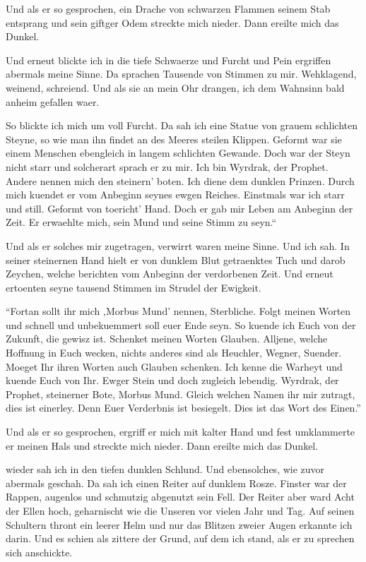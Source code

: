\documentclass[a5paper,8pt]{book}
\begin{document}
Und als er so gesprochen, ein Drache von schwarzen Flammen seinem Stab entsprang und sein giftger Odem streckte mich nieder. Dann ereilte mich das Dunkel.


Und erneut blickte ich in die tiefe Schwaerze und Furcht und Pein ergriffen abermals meine Sinne.
Da sprachen Tausende von Stimmen zu mir. Wehklagend, weinend, schreiend.
Und als sie an mein Ohr drangen, ich dem Wahnsinn bald anheim gefallen waer.

So blickte ich mich um voll Furcht. Da sah ich eine Statue von grauem schlichten Steyne, so wie man ihn findet an des Meeres steilen Klippen. Geformt war sie einem Menschen ebengleich in langem schlichten Gewande. Doch war der Steyn nicht starr und solcherart sprach er zu mir.
Ich bin Wyrdrak, der Prophet. Andere nennen mich den steinern’ boten. Ich diene dem dunklen Prinzen. Durch mich kuendet er vom Anbeginn seynes ewgen Reiches. Einstmals war ich starr und still. Geformt von toericht’ Hand. Doch er gab mir Leben am Anbeginn der Zeit. Er erwaehlte mich, sein Mund und seine Stimm zu seyn.“

Und als er solches mir zugetragen, verwirrt waren meine Sinne. Und ich sah. In seiner steinernen Hand hielt er von dunklem Blut getraenktes Tuch und darob Zeychen, welche berichten vom Anbeginn der verdorbenen Zeit. Und erneut ertoenten seyne tausend Stimmen im Strudel der Ewigkeit.

``Fortan sollt ihr mich ‚Morbus Mund’ nennen, Sterbliche. Folgt meinen Worten und schnell und unbekuemmert soll euer Ende seyn. So kuende ich Euch von der Zukunft, die gewisz ist. Schenket meinen Worten  Glauben. Alljene, welche Hoffnung in Euch wecken, nichts anderes sind als Heuchler, Wegner, Suender. Moeget Ihr ihren Worten auch Glauben schenken. Ich kenne die Warheyt und kuende Euch von Ihr. Ewger Stein und doch zugleich lebendig. Wyrdrak, der Prophet, steinerner Bote, Morbus Mund.
Gleich welchen Namen ihr mir zutragt, dies ist einerley. Denn Euer Verderbnis ist besiegelt. Dies ist das Wort des Einen.''

Und als er so gesprochen, ergriff er mich mit kalter Hand und fest umklammerte er meinen Hals und streckte mich nieder. Dann ereilte mich das Dunkel.

wieder sah ich in den tiefen dunklen Schlund. Und ebensolches, wie zuvor abermals geschah. Da sah ich einen Reiter auf dunklem Rosze. Finster war der Rappen, augenlos und schmutzig abgenutzt sein Fell. Der Reiter aber ward Acht der Ellen hoch, geharnischt wie die Unseren vor vielen Jahr und Tag. Auf seinen Schultern thront ein leerer Helm und nur das Blitzen zweier Augen erkannte ich darin. Und es schien als zittere der Grund, auf dem ich stand, als er zu sprechen sich anschickte.
\end{document}
